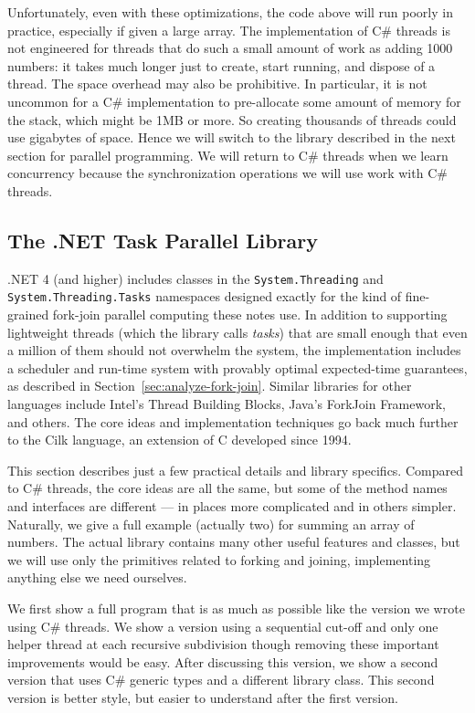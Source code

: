 \documentclass[10pt]{article}
\begin{document}
Unfortunately, even with these optimizations, the code above will run
poorly in practice, especially if given a large array.  The
implementation of C\# threads is not engineered for threads that do
such a small amount of work as adding 1000 numbers: it takes much
longer just to create, start running, and dispose of a thread.
The space overhead may also be prohibitive. In particular, it is not
uncommon for a C\# implementation to pre-allocate some amount of memory 
for the stack, which might be 1MB or more.  So
creating thousands of threads could use gigabytes of space.  Hence we
will switch to the library described in the next section for parallel
programming.  We will return to C\# threads when we learn
concurrency because the synchronization operations we will use work
with C\# threads.

\subsection{The .NET Task Parallel Library}
\label{sec:dotnet-tpl}

.NET 4 (and higher) includes classes in the {\tt System.Threading} and {\tt System.Threading.Tasks} namespaces
designed exactly for the kind of fine-grained fork-join parallel
computing these notes use.  In addition to supporting lightweight
threads (which the library calls \emph{tasks}) that are small enough
that even a million of them should not overwhelm the system, the
implementation includes a scheduler and run-time system with provably
optimal expected-time guarantees, as described in
Section~\ref{sec:analyze-fork-join}.  Similar libraries for other
languages include Intel's Thread Building Blocks, Java's ForkJoin Framework, 
and others.  The core ideas and
implementation techniques go back much further to the Cilk language,
an extension of C developed since 1994.

This section describes just a few practical details and library
specifics.  Compared to C\# threads, the core ideas are all the same,
but some of the method names and interfaces are different --- in
places more complicated and in others simpler.  Naturally, we give a
full example (actually two) for summing an array of numbers.  The
actual library contains many other useful features and classes, but we
will use only the primitives related to forking and joining,
implementing anything else we need ourselves.

We first show a full program that is as
much as possible like the version we wrote using C\# threads.  We
show a version using a sequential cut-off and only one helper thread
at each recursive subdivision though removing these important
improvements would be easy.  After discussing this version, we show a
second version that uses C\# generic types and a different library
class.  This second version is better style, but easier to understand
after the first version.
\end{document}
